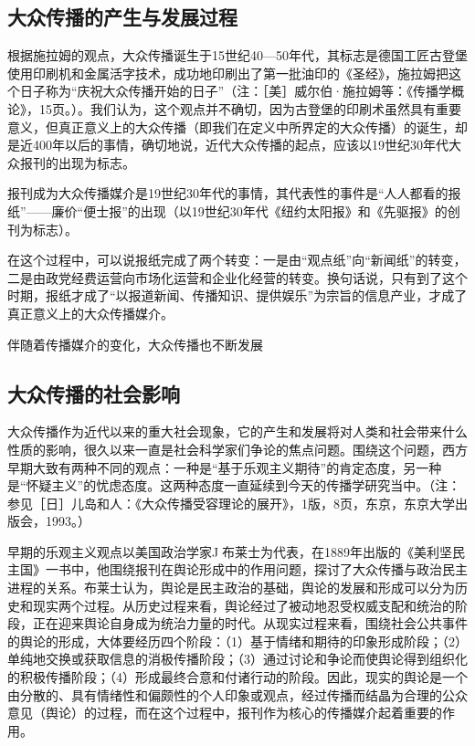 \documentclass[UTF8,12pt]{ctexart}
\numberwithin{equation}{section} %
\numberwithin{figure}{section}
\numberwithin{table}{section}
\begin{document}
	
	\subsection{大众传播的产生与发展过程}
	根据施拉姆的观点，大众传播诞生于15世纪40—50年代，其标志是德国工匠古登堡使用印刷机和金属活字技术，成功地印刷出了第一批油印的《圣经》，施拉姆把这个日子称为“庆祝大众传播开始的日子”（注：［美］威尔伯·施拉姆等：《传播学概论》，15页。）。我们认为，这个观点并不确切，因为古登堡的印刷术虽然具有重要意义，但真正意义上的大众传播（即我们在定义中所界定的大众传播）的诞生，却是近400年以后的事情，确切地说，近代大众传播的起点，应该以19世纪30年代大众报刊的出现为标志。
	
	报刊成为大众传播媒介是19世纪30年代的事情，其代表性的事件是“人人都看的报纸”——廉价“便士报”的出现（以19世纪30年代《纽约太阳报》和《先驱报》的创刊为标志）。
	
	在这个过程中，可以说报纸完成了两个转变：一是由“观点纸”向“新闻纸”的转变，二是由政党经费运营向市场化运营和企业化经营的转变。换句话说，只有到了这个时期，报纸才成了“以报道新闻、传播知识、提供娱乐”为宗旨的信息产业，才成了真正意义上的大众传播媒介。
	
	伴随着传播媒介的变化，大众传播也不断发展
	
	\subsection{大众传播的社会影响}
	大众传播作为近代以来的重大社会现象，它的产生和发展将对人类和社会带来什么性质的影响，很久以来一直是社会科学家们争论的焦点问题。围绕这个问题，西方早期大致有两种不同的观点：一种是“基于乐观主义期待”的肯定态度，另一种是“怀疑主义”的忧虑态度。这两种态度一直延续到今天的传播学研究当中。（注：参见［日］儿岛和人：《大众传播受容理论的展开》，1版，8页，东京，东京大学出版会，1993。）
	
	早期的乐观主义观点以美国政治学家J布莱士为代表，在1889年出版的《美利坚民主国》一书中，他围绕报刊在舆论形成中的作用问题，探讨了大众传播与政治民主进程的关系。布莱士认为，舆论是民主政治的基础，舆论的发展和形成可以分为历史和现实两个过程。从历史过程来看，舆论经过了被动地忍受权威支配和统治的阶段，正在迎来舆论自身成为统治力量的时代。从现实过程来看，围绕社会公共事件的舆论的形成，大体要经历四个阶段：（1）基于情绪和期待的印象形成阶段；（2）单纯地交换或获取信息的消极传播阶段；（3）通过讨论和争论而使舆论得到组织化的积极传播阶段；（4）形成最终合意和付诸行动的阶段。因此，现实的舆论是一个由分散的、具有情绪性和偏颇性的个人印象或观点，经过传播而结晶为合理的公众意见（舆论）的过程，而在这个过程中，报刊作为核心的传播媒介起着重要的作用。
	
\end{document}

